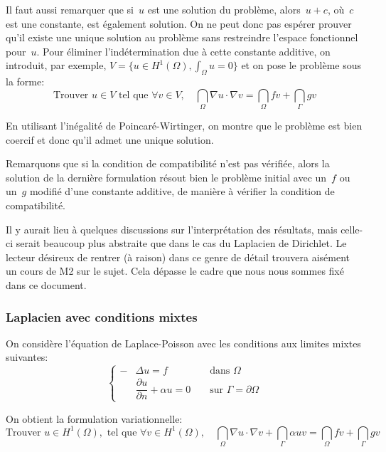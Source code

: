 \medskip
Il faut aussi remarquer que si~$u$ est une solution du problème, alors~$u+c$,
où~$c$ est une constante, est également solution.
On ne peut donc pas espérer prouver qu'il existe une unique solution
au problème sans restreindre l'espace fonctionnel pour~$u$.
Pour éliminer l'indétermination due à cette constante additive, on introduit, par exemple, $V = \{u\in H^1(\Omega), \int_\Omega u=0\}$
et on pose le problème sous la forme:
\begin{equation}
\text{Trouver } u \in V \text{ tel que }
\forall v\in V,\quad \dint_\Omega \nabla u\cdot\nabla v = \dint_\Omega fv + \dint_\Gamma gv
\end{equation}

En utilisant l'inégalité de Poincaré-Wirtinger, on montre que le problème est bien
coercif et donc qu'il admet une unique solution.

\medskip
Remarquons que si la condition de compatibilité n'est pas vérifiée,
alors la solution de la dernière formulation résout bien le problème initial avec
un~$f$ ou un~$g$ modifié d'une constante additive, de manière à vérifier
la condition de compatibilité.

\medskip
Il y aurait lieu à quelques discussions sur l'interprétation des résultats,
mais celle-ci serait beaucoup plus abstraite que dans le cas du Laplacien de Dirichlet.
Le lecteur désireux de rentrer (à raison) dans ce genre de détail trouvera
aisément un cours de M2 sur le sujet.
Cela dépasse le cadre que nous nous sommes fixé dans ce document.

\medskip
\subsubsection{Laplacien avec conditions mixtes}
On considère l'équation de Laplace-Poisson avec les conditions aux limites mixtes suivantes:
\begin{equation}\left\{\begin{aligned}
-&\Delta u=f &&\text{ dans } \Omega\\
&\dfrac{\partial u}{\partial n}+\alpha u=0 &&\text{ sur } \Gamma=\partial\Omega
\end{aligned}
\right.
\end{equation}

\medskip
On obtient la formulation variationnelle:
\begin{equation}
\text{Trouver } u \in H^1(\Omega), \text{ tel que }
\forall v\in H^1(\Omega),\quad \dint_\Omega \nabla u\cdot\nabla v +\dint_\Gamma \alpha u v = \dint_\Omega fv + \dint_\Gamma gv
\end{equation}


